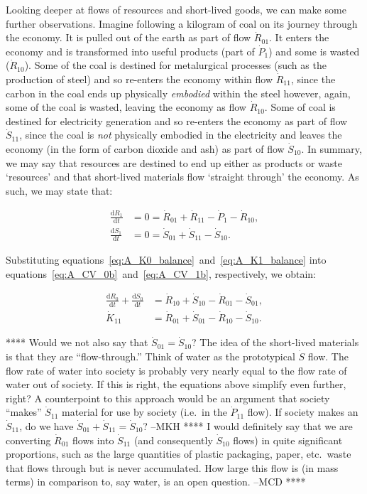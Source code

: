 Looking deeper at flows of resources and short-lived goods,
we can make some further observations. 
Imagine following a kilogram of coal on its journey
through the economy. It is pulled out of the earth as part
of flow $\dot{R}_{01}$. 
It enters the economy and is transformed into useful
products (part of $\dot{P}_{1}$) and some is wasted ($\dot{R}_{10}$).
Some of the coal is destined for metalurgical processes 
(such as the production of steel)
and so re-enters the economy within flow $\dot{R}_{11}$,
since the carbon in the coal ends up physically
\emph{embodied} within the steel however,
again,
some of the coal is wasted,
leaving the economy as flow $\dot{R}_{10}$. 
Some of coal is destined for electricity generation
and so re-enters the economy as part of flow $\dot{S}_{11}$,
since the coal is \emph{not} physically embodied
in the electricity and leaves the economy
(in the form of carbon dioxide and ash)
as part of flow $\dot{S}_{10}$.
In summary, we may say that resources are destined
to end up either as products or waste `resources'
and that short-lived materials flow `straight through'
the economy. 
As such,
we may state that:

\begin{align}
\label{eq:A_R1_balance}
	\frac{\mathrm{d}R_1}{\mathrm{d}t}		&
	= 0
	= \dot{R}_{01}
	+ \dot{R}_{11}
	- \dot{P}_{1}
	- \dot{R}_{10},							\\
\label{eq:A_S1_balance}
	\frac{\mathrm{d}S_1}{\mathrm{d}t}		&
	= 0
	= \dot{S}_{01}
	+ \dot{S}_{11}
	- \dot{S}_{10}.
\end{align}

Substituting equations~\ref{eq:A_K0_balance}~and~\ref{eq:A_K1_balance}
into equations~\ref{eq:A_CV_0b}~and~\ref{eq:A_CV_1b}, respectively, we obtain:

\begin{align}\label{eq:A_CV_0c}
	\frac{\mathrm{d}R_0}{\mathrm{d}t}		
	+	\frac{\mathrm{d}S_0}{\mathrm{d}t}		&	
	=	\dot{R}_{10}		
	+	\dot{S}_{10}	
	-	\dot{R}_{01}											
	-	\dot{S}_{01},							\\
	\label{eq:A_CV_1c}
	\dot{K}_{11}								&
	= \dot{R}_{01} 
	+ \dot{S}_{01} 
	- \dot{R}_{10}				
	- \dot{S}_{10}.
\end{align}

**** Would we not also say that $\dot{S}_{01} = \dot{S}_{10}$? 
The idea of the short-lived materials is that they are ``flow-through.''
Think of water as the prototypical $\dot{S}$ flow. 
The flow rate of water into society is probably very nearly equal
to the flow rate of water out of society. 
If this is right, the equations above simplify even further, right? 
A counterpoint to this approach would be an argument that society
``makes'' $\dot{S}_{11}$ material for use by society (i.e.\ in the $\dot{P}_{11}$ flow).
If society makes an $\dot{S}_{11}$, do we have
$\dot{S}_{01} + \dot{S}_{11} = \dot{S}_{10}$?  --MKH ****
I would definitely say that we are converting $\dot{R}_{01}$
flows into $\dot{S}_{11}$ (and consequently $\dot{S}_{10}$ flows)
in quite significant proportions, such as the large quantities of
plastic packaging, paper,
etc.\ waste that flows through but is never accumulated.
How large this flow is (in mass terms) in comparison to,
say water,
is an open question. --MCD ****

